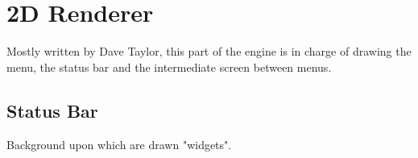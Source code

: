 \section{2D Renderer}
Mostly written by Dave Taylor, this part of the engine is in charge of drawing the menu, the status bar and the intermediate screen between menus.

\subsection{Status Bar}
Background upon which are drawn "widgets".